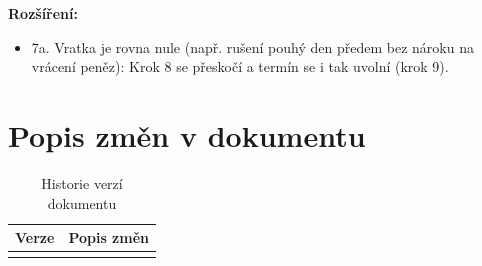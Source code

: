\documentclass[11pt, a4paper]{article}
\begin{document}
\noindent \textbf{Rozšíření:}
\begin{itemize}
    \item 7a. Vratka je rovna nule (např. rušení pouhý den předem bez nároku na vrácení peněz): Krok 8 se přeskočí a termín se i tak uvolní (krok 9).
\end{itemize}

\newpage
\section{Popis změn v dokumentu}

\begin{table}[htbp]
    \centering
    \renewcommand{\arraystretch}{1.3}
    \begin{tabular}{@{}c p{12cm}@{}}
        \toprule
        \textbf{Verze} & \textbf{Popis změn} \\
        \midrule
        & \\
        \bottomrule
    \end{tabular}
    \caption{Historie verzí dokumentu}
    \label{tab:verzovani}
\end{table}
\end{document}
